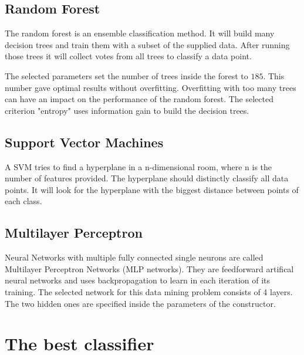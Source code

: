 \subsection{Random Forest}

The random forest is an ensemble classification method. It will build many decision trees and train them with a subset of the supplied data. After running those trees it will collect votes from all trees to classify a data point.

The selected parameters set the number of trees inside the forest to $185$. This number gave optimal results without overfitting. Overfitting with too many trees can have an impact on the performance of the random forest. The selected criterion "entropy" uses information gain to build the decision trees.



\subsection{Support Vector Machines}

A SVM tries to find a hyperplane in a n-dimensional room, where n is the number of features provided. The hyperplane should distinctly classify all data points. It will look for the hyperplane with the biggest distance between points of each class.



\subsection{Multilayer Perceptron}

Neural Networks with multiple fully connected single neurons are called Multilayer Perceptron Networks (MLP networks). They are feedforward artifical neural networks and uses backpropagation to learn in each iteration of its training. The selected network for this data mining problem consists of 4 layers. The two hidden ones are specified inside the parameters of the constructor.



\section{The best classifier}

